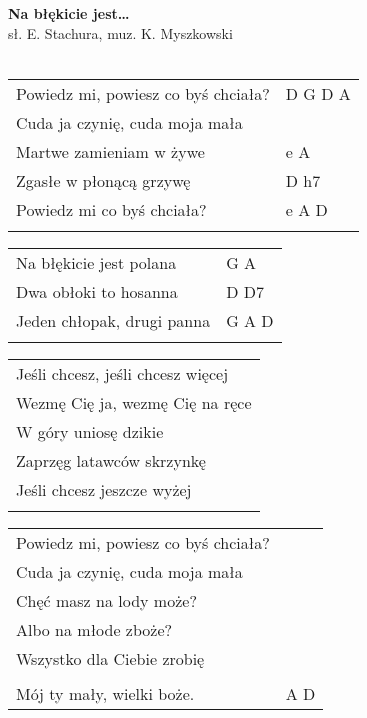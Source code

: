 \documentclass[a5paper]{article}
\begin{document}


\noindent
\fontsize{12pt}{15pt}\selectfont
\textbf{Na błękicie jest…} \\
\fontsize{8pt}{10pt}\selectfont
sł. E. Stachura, muz. K. Myszkowski \\ \\
\fontsize{10pt}{12pt}\selectfont
{}
\begin{tabular}{@{}p{7.50cm}p{3cm}@{}}
\noindent
Powiedz mi, powiesz co byś chciała? & D G D A \\
Cuda ja czynię, cuda moja mała & \\
Martwe zamieniam w żywe & e A \\
Zgasłe w płonącą grzywę & D h7 \\
Powiedz mi co byś chciała? & e A D \\ \\
\end{tabular}

\noindent
\begin{tabular}{@{}p{6.50cm}p{3cm}@{}}
Na błękicie jest polana & G A \\
Dwa obłoki to hosanna & D D7 \\
Jeden chłopak, drugi panna & G A D \\ \\
\end{tabular}

\noindent
\begin{tabular}{@{}p{7.50cm}@{}}
Jeśli chcesz, jeśli chcesz więcej \\
Wezmę Cię ja, wezmę Cię na ręce \\
W góry uniosę dzikie \\
Zaprzęg latawców skrzynkę \\
Jeśli chcesz jeszcze wyżej \\ \\
\end{tabular}

\noindent
\begin{tabular}{@{}p{7.50cm}p{3cm}@{}}
	Powiedz mi, powiesz co byś chciała? & \\
	Cuda ja czynię, cuda moja mała & \\
	Chęć masz na lody może? & \\
	Albo na młode zboże? & \\
	Wszystko dla Ciebie zrobię & \\
							 & \\
	Mój ty mały, wielki boże. & A D 
\end{tabular}
\end{document}
